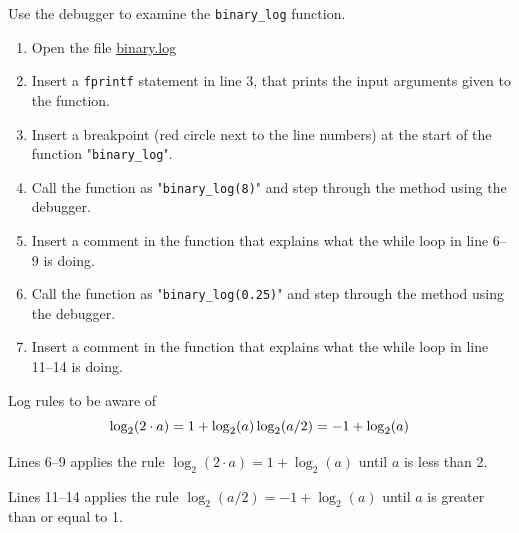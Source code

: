 \begin{ex}
Use the debugger to examine the \verb!binary_log! function.
\begin{enumerate}
\item Open the file \href{https://raw.githubusercontent.com/henrikmidtiby/matlab-notes/master/code/debugger_example_binary_log/binary_log.m}{binary.log}
\item	Insert a \verb!fprintf! statement in line 3, that prints the input arguments given to the function.
\item	Insert a breakpoint (red circle next to the line numbers) at the start of the function "\verb!binary_log!".
\item	Call the function as "\verb!binary_log(8)!" and step through the method using the debugger.
\item	Insert a comment in the function that explains what the while loop in line 6--9 is doing.
\item	Call the function as "\verb!binary_log(0.25)!" and step through the method using the debugger.
\item	Insert a comment in the function that explains what the while loop in line 11--14 is doing.
\end{enumerate}
\begin{hint}
Log rules to be aware of
\[
\log_2(2 \cdot a) = 1 + \log_2(a) \\
\log_2(a / 2) = -1 + \log_2(a)
\]
\end{hint}
\begin{sol}
Lines 6--9 applies the rule $\log_2(2 \cdot a) = 1 + \log_2(a)$ until $a$ is less than 2.

Lines 11--14 applies the rule $\log_2(a / 2) = -1 + \log_2(a)$ until $a$ is greater than or equal to 1.
\end{sol}
\end{ex}
 